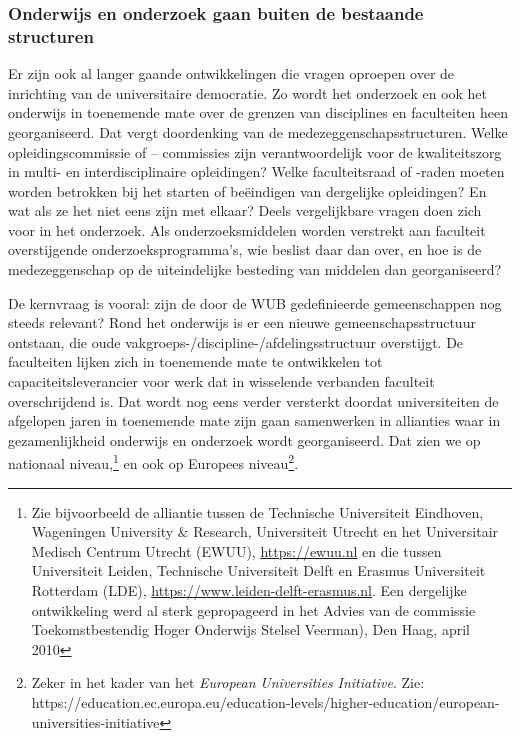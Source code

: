 \documentclass[smallauthor, chapterhaspagenum, nochapterinheader, pagenuminheader,  bigchapnum,medium2, tocpages,  garamond, titleinheader]{jote-book}
\begin{document}
	\subsubsection{Onderwijs en onderzoek gaan buiten de bestaande structuren}



	Er zijn ook al langer gaande ontwikkelingen die vragen oproepen over de inrichting van de universitaire democratie. Zo wordt het onderzoek en ook het onderwijs in toenemende mate over de grenzen van disciplines en faculteiten heen georganiseerd. Dat vergt doordenking van de medezeggenschapsstructuren. Welke opleidingscommissie of -- commissies zijn verantwoordelijk voor de kwaliteitszorg in multi- en interdisciplinaire opleidingen? Welke faculteitsraad of -raden moeten worden betrokken bij het starten of beëindigen van dergelijke opleidingen? En wat als ze het niet eens zijn met elkaar? Deels vergelijkbare vragen doen zich voor in het onderzoek. Als onderzoeksmiddelen worden verstrekt aan faculteit overstijgende onderzoeksprogramma's, wie beslist daar dan over, en hoe is de medezeggenschap op de uiteindelijke besteding van middelen dan georganiseerd?



	De kernvraag is vooral: zijn de door de WUB gedefinieerde gemeenschappen nog steeds relevant? Rond het onderwijs is er een nieuwe gemeenschapsstructuur ontstaan, die oude vakgroeps-/discipline-/afdelingsstructuur overstijgt. De faculteiten lijken zich in toenemende mate te ontwikkelen tot capaciteitsleverancier voor werk dat in wisselende verbanden faculteit overschrijdend is. Dat wordt nog eens verder versterkt doordat universiteiten de afgelopen jaren in toenemende mate zijn gaan samenwerken in allianties waar in gezamenlijkheid onderwijs en onderzoek wordt georganiseerd. Dat zien we op nationaal niveau,\footnote{Zie bijvoorbeeld de alliantie tussen de Technische Universiteit Eindhoven, Wageningen University \& Research, Universiteit Utrecht en het Universitair Medisch Centrum Utrecht (EWUU), \href{https://www.leiden-delft-erasmus.nl}{https://ewuu.nl} en die tussen Universiteit Leiden, Technische Universiteit Delft en Erasmus Universiteit Rotterdam (LDE), \href{https://www.nederlandrechtsstaat.nl/academische-vrijheid-in-tijden-van-wakkerte-en-cancelcultuur/}{https://www.leiden-delft-erasmus.nl}. Een dergelijke ontwikkeling werd al sterk gepropageerd in het Advies van de commissie Toekomstbestendig Hoger Onderwijs Stelsel Veerman), Den Haag, april 2010} en ook op Europees niveau\footnote{Zeker in het kader van het \emph{European }\emph{Universities}\emph{ }\emph{Initiative}. Zie: https://education.ec.europa.eu/education-levels/higher-education/european-universities-initiative}.
\end{document}
